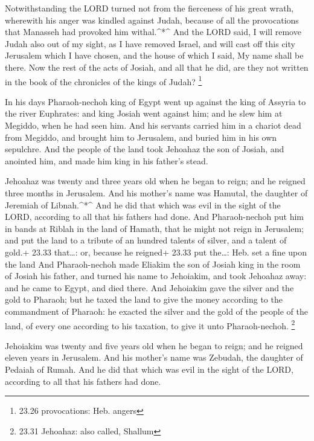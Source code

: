  Notwithstanding the LORD turned not from the fierceness of
his great wrath, wherewith his anger was kindled against Judah, because
of all the provocations that Manasseh had provoked him withal.\^{}*\^{}
 And the LORD said, I will remove Judah also out of my
sight, as I have removed Israel, and will cast off this city Jerusalem
which I have chosen, and the house of which I said, My name shall be
there.  Now the rest of the acts of Josiah, and all that he
did, are they not written in the book of the chronicles of the kings of
Judah? \footnote{23.26 provocations: Heb. angers}

 In his days Pharaoh-nechoh king of Egypt went up against
the king of Assyria to the river Euphrates: and king Josiah went against
him; and he slew him at Megiddo, when he had seen him.  And
his servants carried him in a chariot dead from Megiddo, and brought him
to Jerusalem, and buried him in his own sepulchre. And the people of the
land took Jehoahaz the son of Josiah, and anointed him, and made him
king in his father's stead.

 Jehoahaz was twenty and three years old when he began to
reign; and he reigned three months in Jerusalem. And his mother's name
was Hamutal, the daughter of Jeremiah of Libnah.\^{}*\^{} 
And he did that which was evil in the sight of the LORD, according to
all that his fathers had done.  And Pharaoh-nechoh put him
in bands at Riblah in the land of Hamath, that he might not reign in
Jerusalem; and put the land to a tribute of an hundred talents of
silver, and a talent of gold.+ 23.33 that\ldots: or, because he reigned+
23.33 put the\ldots: Heb. set a fine upon the land  And
Pharaoh-nechoh made Eliakim the son of Josiah king in the room of Josiah
his father, and turned his name to Jehoiakim, and took Jehoahaz away:
and he came to Egypt, and died there.  And Jehoiakim gave
the silver and the gold to Pharaoh; but he taxed the land to give the
money according to the commandment of Pharaoh: he exacted the silver and
the gold of the people of the land, of every one according to his
taxation, to give it unto Pharaoh-nechoh. \footnote{23.31 Jehoahaz: also
  called, Shallum}

 Jehoiakim was twenty and five years old when he began to
reign; and he reigned eleven years in Jerusalem. And his mother's name
was Zebudah, the daughter of Pedaiah of Rumah.  And he did
that which was evil in the sight of the LORD, according to all that his
fathers had done.


